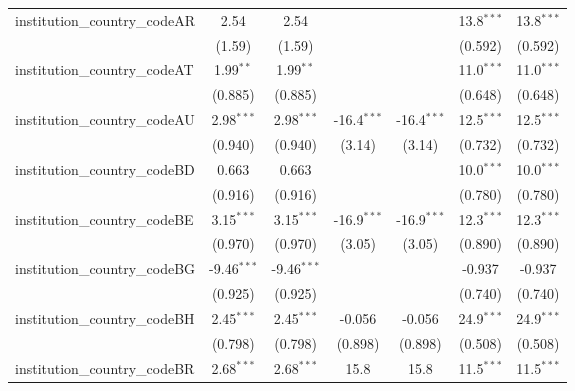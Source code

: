 \begin{tabular}{lcccccc}
   institution\_country\_codeAR          & 2.54           & 2.54           &               &               & 13.8$^{***}$  & 13.8$^{***}$\\   
                                         & (1.59)         & (1.59)         &               &               & (0.592)       & (0.592)\\   
   institution\_country\_codeAT          & 1.99$^{**}$    & 1.99$^{**}$    &               &               & 11.0$^{***}$  & 11.0$^{***}$\\   
                                         & (0.885)        & (0.885)        &               &               & (0.648)       & (0.648)\\   
   institution\_country\_codeAU          & 2.98$^{***}$   & 2.98$^{***}$   & -16.4$^{***}$ & -16.4$^{***}$ & 12.5$^{***}$  & 12.5$^{***}$\\   
                                         & (0.940)        & (0.940)        & (3.14)        & (3.14)        & (0.732)       & (0.732)\\   
   institution\_country\_codeBD          & 0.663          & 0.663          &               &               & 10.0$^{***}$  & 10.0$^{***}$\\   
                                         & (0.916)        & (0.916)        &               &               & (0.780)       & (0.780)\\   
   institution\_country\_codeBE          & 3.15$^{***}$   & 3.15$^{***}$   & -16.9$^{***}$ & -16.9$^{***}$ & 12.3$^{***}$  & 12.3$^{***}$\\   
                                         & (0.970)        & (0.970)        & (3.05)        & (3.05)        & (0.890)       & (0.890)\\   
   institution\_country\_codeBG          & -9.46$^{***}$  & -9.46$^{***}$  &               &               & -0.937        & -0.937\\   
                                         & (0.925)        & (0.925)        &               &               & (0.740)       & (0.740)\\   
   institution\_country\_codeBH          & 2.45$^{***}$   & 2.45$^{***}$   & -0.056        & -0.056        & 24.9$^{***}$  & 24.9$^{***}$\\   
                                         & (0.798)        & (0.798)        & (0.898)       & (0.898)       & (0.508)       & (0.508)\\   
   institution\_country\_codeBR          & 2.68$^{***}$   & 2.68$^{***}$   & 15.8          & 15.8          & 11.5$^{***}$  & 11.5$^{***}$\\   

\end{tabular}
